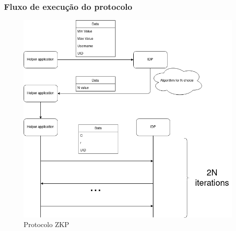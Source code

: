 \subsubsection{Fluxo de execução do protocolo}

\begin{figure}[H]
    \caption{Protocolo ZKP}
    \includegraphics[width=\textwidth]{img/zkp.png}
    \centering
\end{figure}


